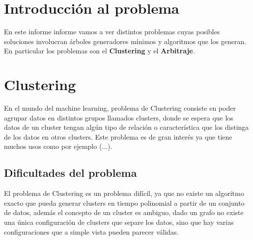 \documentclass[8pt,a4paper]{article}
\begin{document}

\fecha{\today}



\maketitle

\newpage
%

\section{Introducción al problema}
En este informe informe vamos a ver distintos problemas cuyas posibles soluciones involucran árboles generadores mínimos y algoritmos que los generan. En particular los problemas son el \textbf{Clustering} y el \textbf{Arbitraje}.

\section{Clustering}
En el mundo del machine learning, problema de Clustering consiste en poder agrupar datos en distintos grupos llamados clusters, donde se espera que los datos de un cluster tengan algún tipo de relación o característica que los distinga de los datos en otros clusters. Este problema es de gran interés ya que tiene muchos usos como por ejemplo (...).
%
%
\subsection{Dificultades del problema}
El problema de Clustering es un problema difícil, ya que no existe un algoritmo exacto que pueda generar clusters en tiempo polinomial a partir de un conjunto de datos, además el concepto de un cluster es ambiguo, dado un grafo no existe una única configuración de clusters que separe los datos, sino que hay varias configuraciones que a simple vista pueden parecer válidas.
\end{document}
